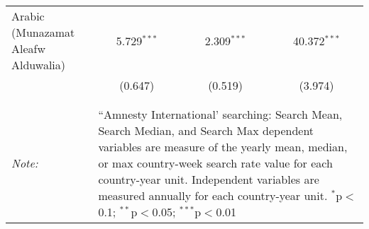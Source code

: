 \begin{table}[!htbp]
\begin{tabular}{@{\extracolsep{5pt}}lccc}
  Arabic (Munazamat Aleafw Alduwalia) & 5.729$^{***}$ & 2.309$^{***}$ & 40.372$^{***}$ \\ 
  & (0.647) & (0.519) & (3.974) \\ 
 \hline \\[-1.8ex] 
\hline 
\hline \\[-1.8ex] 
\textit{Note:}  & \multicolumn{3}{l}{\parbox[t]{8cm}{``Amnesty International' searching: Search Mean, Search Median, and Search Max dependent variables are measure of the yearly mean, median, or max country-week search rate value for each country-year unit. Independent variables are measured annually for each country-year unit. $^{*}$p$<$0.1; $^{**}$p$<$0.05; $^{***}$p$<$0.01}} \\ 
\end{tabular} 
\end{table} 
